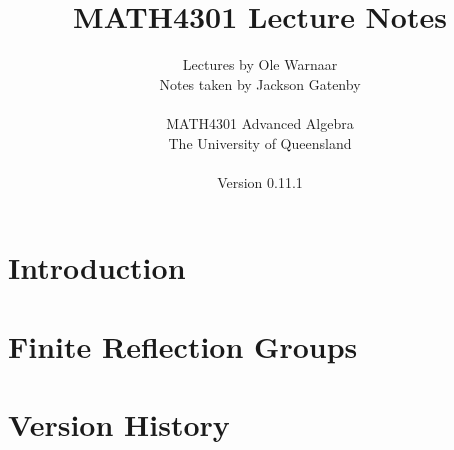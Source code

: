 \documentclass[a4paper]{report}
\title{MATH4301 Lecture Notes}
\author{Lectures by Ole Warnaar\\
Notes taken by Jackson Gatenby\\
\\
MATH4301 Advanced Algebra\\
The University of Queensland\\
\\
Version 0.11.1}
\begin{document}
\maketitle
\tableofcontents



\chapter{Introduction}







\chapter{Finite Reflection Groups}









\appendix

\chapter{Version History}

\end{document}
